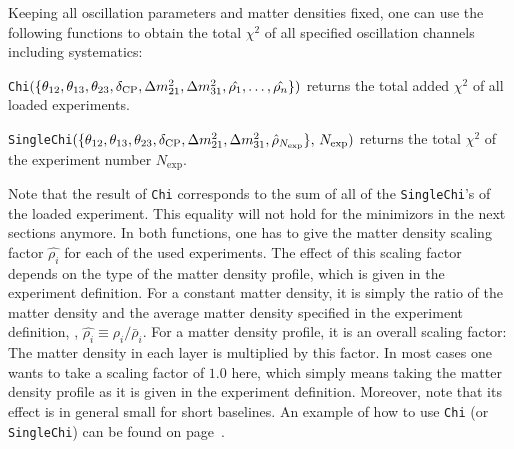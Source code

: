 Keeping all oscillation parameters and matter densities fixed, one can use the following functions to obtain the total $\chi^2$ of all specified oscillation channels including systematics:
\begin{function} 
{\tt Chi}$(\{ \theta_{12}, \theta_{13}, \theta_{23}, \delta_{\mathrm{CP}} , \Delta m_{21}^2 , \Delta m_{31}^2, \hat{\rho_1}, \hdots , \hat{\rho_n} \})$  returns the total added $\chi^2$ of all loaded experiments.
\end{function}
\begin{function}
 {\tt SingleChi}$(\{ \theta_{12}, \theta_{13}, \theta_{23}, \delta_{\mathrm{CP}} , \Delta m_{21}^2 , \Delta m_{31}^2, \hat{\rho}_{N_{\mathrm{exp}}} \}, \, N_{\mathrm{exp}} )$  returns the total $\chi^2$ of the experiment number $N_{\mathrm{exp}}$.
\end{function}
Note that the result of {\tt Chi} corresponds to the sum of all of the {\tt SingleChi}'s of the loaded experiment. This equality will not hold for the minimizors in the next sections anymore. In both functions, one has to give the matter density scaling factor $\hat{\rho_i}$ for each of the used experiments. The effect of this scaling factor depends on the type of the matter density profile, which is given in the  experiment definition. For a constant matter density, it is simply the ratio of the matter density and the average matter density specified in the experiment definition, \ie , $\hat{\rho_i} \equiv \rho_i/\bar{\rho}_i$. For a matter density profile, it is an overall scaling factor: The matter density in each layer is multiplied by this factor. In most cases one wants to take a scaling factor of $1.0$ here, which simply means taking the matter density profile as it is given in the experiment definition. Moreover, note that its effect is in general small for short baselines. An example of how to use  {\tt Chi} (or {\tt SingleChi}) can be found on page~\pageref{ex:corrth13dcp}.  

